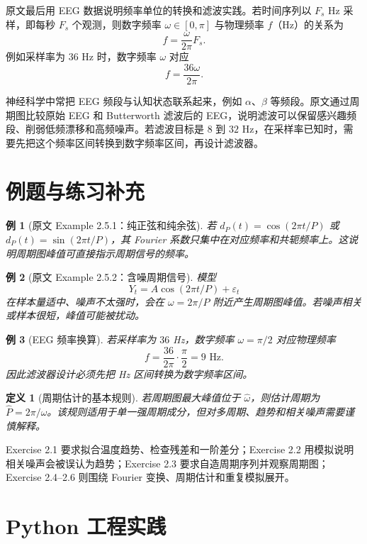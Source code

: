 \documentclass[11pt,a4paper,openany]{ctexbook}
\newtheorem{definition}{定义}[section]
\newtheorem{example}{例}[section]
\begin{document}
原文最后用 EEG 数据说明频率单位的转换和滤波实践。若时间序列以 \(F_s\) Hz 采样，即每秒 \(F_s\) 个观测，则数字频率 \(\omega\in[0,\pi]\) 与物理频率 \(f\)（Hz）的关系为
\[
  f=\frac{\omega}{2\pi}F_s.
\]
例如采样率为 \(36\) Hz 时，数字频率 \(\omega\) 对应
\[
  f=\frac{36\omega}{2\pi}.
\]

神经科学中常把 EEG 频段与认知状态联系起来，例如 \(\alpha\)、\(\beta\) 等频段。原文通过周期图比较原始 EEG 和 Butterworth 滤波后的 EEG，说明滤波可以保留感兴趣频段、削弱低频漂移和高频噪声。若滤波目标是 \(8\) 到 \(32\) Hz，在采样率已知时，需要先把这个频率区间转换到数字频率区间，再设计滤波器。

\section{例题与练习补充}

\begin{example}[原文 Example 2.5.1：纯正弦和纯余弦]
若 \(d_P(t)=\cos(2\pi t/P)\) 或 \(d_P(t)=\sin(2\pi t/P)\)，其 Fourier 系数只集中在对应频率和共轭频率上。这说明周期图峰值可直接指示周期信号的频率。
\end{example}

\begin{example}[原文 Example 2.5.2：含噪周期信号]
模型
\[
  Y_t=A\cos(2\pi t/P)+\varepsilon_t
\]
在样本量适中、噪声不太强时，会在 \(\omega=2\pi/P\) 附近产生周期图峰值。若噪声相关或样本很短，峰值可能被扰动。
\end{example}

\begin{example}[EEG 频率换算]
若采样率为 \(36\) Hz，数字频率 \(\omega=\pi/2\) 对应物理频率
\[
  f=\frac{36}{2\pi}\cdot\frac{\pi}{2}=9\text{ Hz}.
\]
因此滤波器设计必须先把 Hz 区间转换为数字频率区间。
\end{example}

\begin{definition}[周期估计的基本规则]
若周期图最大峰值位于 \(\hat\omega\)，则估计周期为 \(\hat P=2\pi/\hat\omega\)。该规则适用于单一强周期成分，但对多周期、趋势和相关噪声需要谨慎解释。
\end{definition}

Exercise 2.1 要求拟合温度趋势、检查残差和一阶差分；Exercise 2.2 用模拟说明相关噪声会被误认为趋势；Exercise 2.3 要求自造周期序列并观察周期图；Exercise 2.4--2.6 则围绕 Fourier 变换、周期估计和重复模拟展开。

\section{Python 工程实践}
\end{document}
